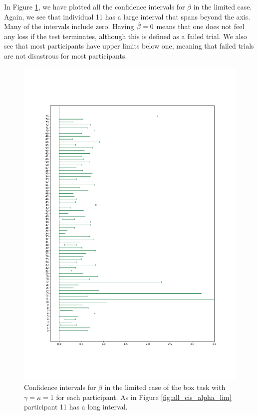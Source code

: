 In Figure \ref{fig:all_cis_beta}, we have plotted all the confidence intervals for $\beta$ in the limited case. Again, we see that individual 11 has a large interval that spans beyond the axis. Many of the intervals include zero. Having $\hat{\beta}=0$ means that one does not feel any loss if the test terminates, although this is defined as a failed trial. We also see that most participants have upper limits below one, meaning that failed trials are not disastrous for most participants. 
\begin{figure}
    \centering
    \includegraphics[scale=0.37]{pictures/all_cis_lim_beta_pdf.pdf}
    \caption[CIs for $\beta$, limited. $\gamma=\kappa=1$]{Confidence intervals for $\beta$ in the limited case of the box task with $\gamma=\kappa=1$ for each participant. As in Figure \ref{fig:all_cis_alpha_lim} participant 11 has a long interval.}
    \label{fig:all_cis_beta}
\end{figure}

